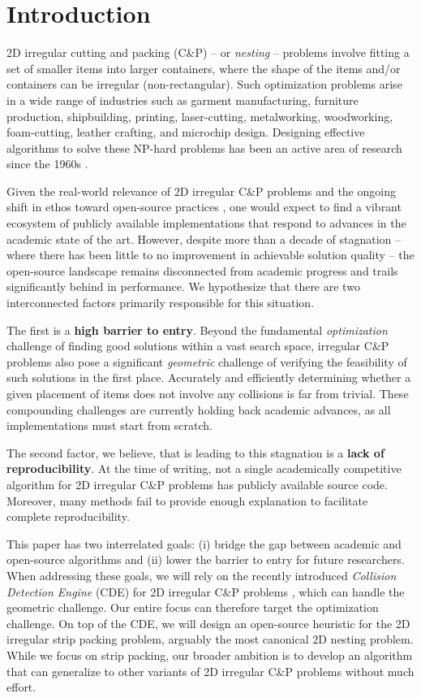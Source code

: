 \documentclass[preprint, 11pt, authoryear]{elsarticle}
\begin{document}
\section{Introduction}
2D irregular cutting and packing (C\&P) -- or \emph{nesting} -- problems involve fitting a set of smaller items into larger containers, where the shape of the items and/or containers can be irregular (non-rectangular).
Such optimization problems arise in a wide range of industries such as garment manufacturing, furniture production, shipbuilding, printing, laser-cutting, metalworking, woodworking, foam-cutting, leather crafting, and microchip design.
Designing effective algorithms to solve these NP-hard problems \citep{fowler1981optimal} has been an active area of research since the 1960s \citep{art1966approach}.

Given the real-world relevance of 2D irregular C\&P problems and the ongoing shift in ethos toward open-source practices \citep{unesco2021openscience}, one would expect to find a vibrant ecosystem of publicly available implementations that respond to advances in the academic state of the art.
However, despite more than a decade of stagnation -- where there has been little to no improvement in achievable solution quality -- the open-source landscape remains disconnected from academic progress and trails significantly behind in performance.
We hypothesize that there are two interconnected factors primarily responsible for this situation.

The first is a \textbf{high barrier to entry}.
Beyond the fundamental \emph{optimization} challenge of finding good solutions within a vast search space, irregular C\&P problems also pose a significant \emph{geometric} challenge of verifying the feasibility of such solutions in the first place.
Accurately and efficiently determining whether a given placement of items does not involve any collisions is far from trivial.
These compounding challenges are currently holding back academic advances, as all implementations must start from scratch.

The second factor, we believe, that is leading to this stagnation is a \textbf{lack of reproducibility}.
At the time of writing, not a single academically competitive algorithm for 2D irregular C\&P problems has publicly available source code.
Moreover, many methods fail to provide enough explanation to facilitate complete reproducibility.

This paper has two interrelated goals: (i) bridge the gap between academic and open-source algorithms and (ii) lower the barrier to entry for future researchers.
When addressing these goals, we will rely on the recently introduced \emph{Collision Detection Engine} (CDE) for 2D irregular C\&P problems \citep{gardeyn2025decoupling}, which can handle the geometric challenge.
Our entire focus can therefore target the optimization challenge.
On top of the CDE, we will design an open-source heuristic for the 2D irregular strip packing problem, arguably the most canonical 2D nesting problem.
While we focus on strip packing, our broader ambition is to develop an algorithm that can generalize to other variants of 2D irregular C\&P problems without much effort.
\end{document}
